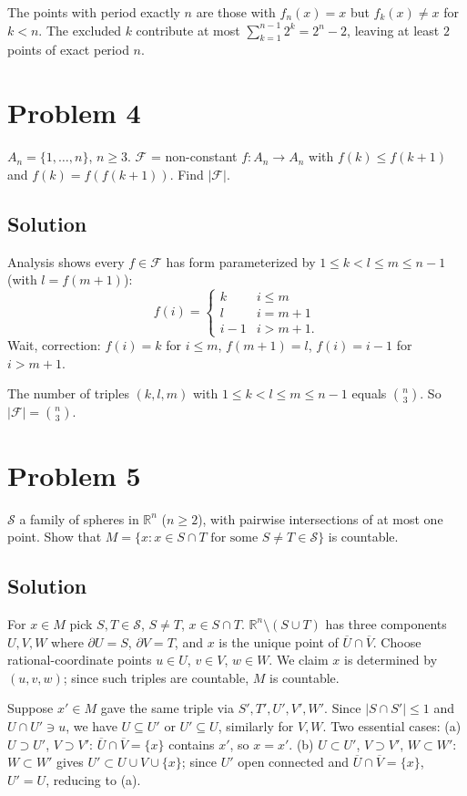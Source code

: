 \documentclass{article}
\begin{document}
The points with period exactly $n$ are those with $f_n(x)=x$ but $f_k(x)\ne x$ for $k<n$. The excluded $k$ contribute at most $\sum_{k=1}^{n-1}2^k = 2^n - 2$, leaving at least $2$ points of exact period $n$.

\section*{Problem 4}
$A_n=\{1,\dots,n\}$, $n\ge 3$. $\mathcal F$ = non-constant $f:A_n\to A_n$ with $f(k)\le f(k+1)$ and $f(k)=f(f(k+1))$. Find $|\mathcal F|$.

\subsection*{Solution}
Analysis shows every $f\in\mathcal F$ has form parameterized by $1\le k < l \le m \le n-1$ (with $l = f(m+1)$):
\[f(i) = \begin{cases} k & i\le m \\ l & i=m+1\\ i-1 & i>m+1.\end{cases}\]
Wait, correction: $f(i)=k$ for $i\le m$, $f(m+1)=l$, $f(i)=i-1$ for $i>m+1$.

The number of triples $(k,l,m)$ with $1\le k<l\le m\le n-1$ equals $\binom{n}{3}$. So $|\mathcal F|=\binom{n}{3}$.

\section*{Problem 5}
$\mathcal S$ a family of spheres in $\mathbb{R}^n$ ($n\ge 2$), with pairwise intersections of at most one point. Show that $M = \{x:x\in S\cap T\text{ for some }S\ne T\in\mathcal S\}$ is countable.

\subsection*{Solution}
For $x\in M$ pick $S,T\in\mathcal S$, $S\ne T$, $x\in S\cap T$. $\mathbb{R}^n\setminus(S\cup T)$ has three components $U,V,W$ where $\partial U=S$, $\partial V=T$, and $x$ is the unique point of $\overline U\cap\overline V$. Choose rational-coordinate points $u\in U$, $v\in V$, $w\in W$. We claim $x$ is determined by $(u,v,w)$; since such triples are countable, $M$ is countable.

Suppose $x'\in M$ gave the same triple via $S',T',U',V',W'$. Since $|S\cap S'|\le 1$ and $U\cap U'\ni u$, we have $U\subseteq U'$ or $U'\subseteq U$, similarly for $V,W$. Two essential cases:
(a) $U\supset U'$, $V\supset V'$: $\overline U\cap\overline V = \{x\}$ contains $x'$, so $x=x'$.
(b) $U\subset U'$, $V\supset V'$, $W\subset W'$: $W\subset W'$ gives $U'\subset U\cup V\cup\{x\}$; since $U'$ open connected and $\overline U\cap\overline V=\{x\}$, $U'=U$, reducing to (a).
\end{document}
